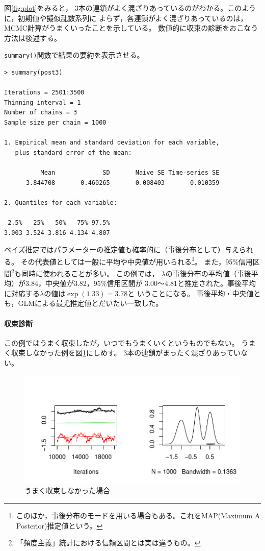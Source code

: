 \documentclass[11pt,uplatex]{jsarticle}
\begin{document}
図\ref{fig:plot}をみると，
3本の連鎖がよく混ざりあっているのがわかる。このように，初期値や擬似乱数系列に
よらず，各連鎖がよく混ざりあっているのは，MCMC計算がうまくいったことを示している。
数値的に収束の診断をおこなう方法は後述する。

\texttt{summary()}関数で結果の要約を表示させる。
\begin{lstlisting}
> summary(post3)

Iterations = 2501:3500
Thinning interval = 1 
Number of chains = 3 
Sample size per chain = 1000 

1. Empirical mean and standard deviation for each variable,
   plus standard error of the mean:

          Mean             SD       Naive SE Time-series SE 
      3.844708       0.460265       0.008403       0.010359 

2. Quantiles for each variable:

 2.5%   25%   50%   75% 97.5% 
3.003 3.524 3.816 4.134 4.807 

\end{lstlisting}
%
ベイズ推定ではパラメーターの推定値も確率的に（事後分布として）与えられる。
その代表値としては一般に平均や中央値が用いられる\footnote{このほか，事後分布のモードを用いる場合もある。これをMAP(Maximum A Posterior)推定値という。}。
また，95\%信用区間\footnote{「頻度主義」統計における信頼区間とは実は違うもの。}も同時に使われることが多い。
この例では，
$\lambda$の事後分布の平均値（事後平均）が3.84，中央値が3.82，95\%信用区間が
3.00〜4.81と推定された。事後平均に対応する$\lambda$の値は$\exp(1.33)=3.78$と
いうことになる。
事後平均・中央値とも，GLMによる最尤推定値とだいたい一致した。

\paragraph{収束診断}
この例ではうまく収束したが，いつでもうまくいくというものでもない。
うまく収束しなかった例を図\ref{bad_mcmc}にしめす。
3本の連鎖がまったく混ざりあっていない。
\begin{figure}[htbp]
	\begin{center}
		\includegraphics[bb=0 0 420 210, clip, width=320 bp]{bad_mcmc.pdf}
	\end{center}
	\caption{うまく収束しなかった場合}
	\label{bad_mcmc}
\end{figure}
\end{document}
